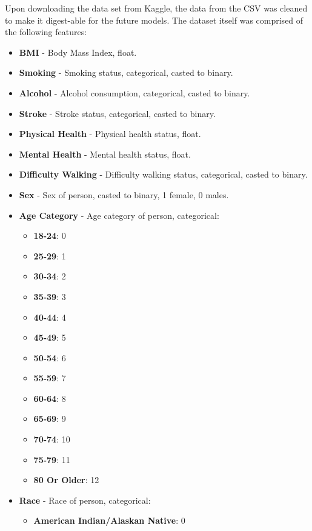 Upon downloading the data set from Kaggle, the data from the CSV was cleaned to make it digest-able for the future models. The dataset itself was comprised of the following features:

\begin{itemize}
    \item \textbf{BMI} - Body Mass Index, float.
    \item \textbf{Smoking} - Smoking status, categorical, casted to binary.
    \item \textbf{Alcohol} - Alcohol consumption, categorical, casted to binary.
    \item \textbf{Stroke} - Stroke status, categorical, casted to binary.
    \item \textbf{Physical Health} - Physical health status, float.
    \item \textbf{Mental Health} - Mental health status, float.
    \item \textbf{Difficulty Walking} - Difficulty walking status, categorical, casted to binary.
    \item \textbf{Sex} - Sex of person, casted to binary, 1 female, 0 males.
    \item \textbf{Age Category} - Age category of person, categorical:
    \begin{itemize}
        \item \textbf{18-24}: 0
        \item \textbf{25-29}: 1
        \item \textbf{30-34}: 2
        \item \textbf{35-39}: 3
        \item \textbf{40-44}: 4
        \item \textbf{45-49}: 5
        \item \textbf{50-54}: 6
        \item \textbf{55-59}: 7
        \item \textbf{60-64}: 8
        \item \textbf{65-69}: 9
        \item \textbf{70-74}: 10
        \item \textbf{75-79}: 11
        \item \textbf{80 Or Older}: 12
    \end{itemize}
    \item \textbf{Race} - Race of person, categorical:
    \begin{itemize}
        \item \textbf{American Indian/Alaskan Native}: 0

\end{itemize}
\end{itemize}
